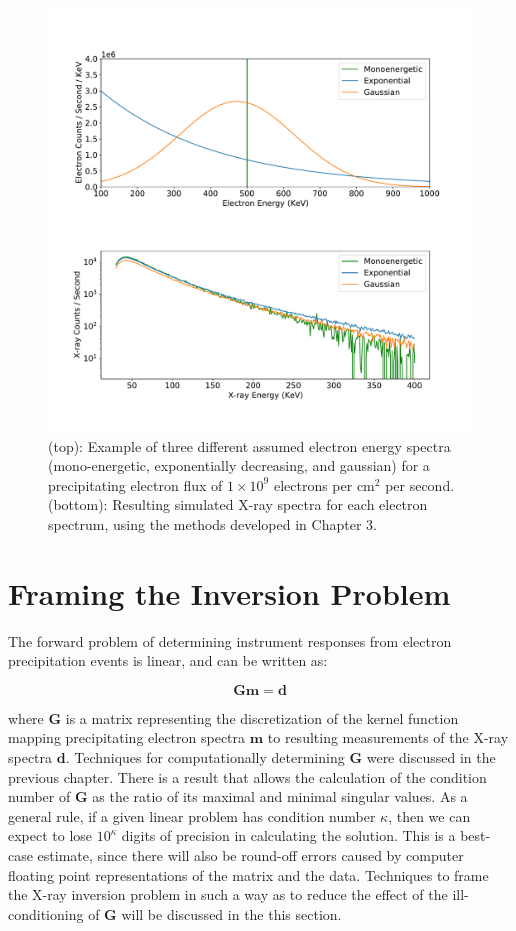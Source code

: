 \begin{figure}[p]
\label{why_ill_conditioned}
\centering
\includegraphics[width=1.0\textwidth]{figures/fig_0.pdf}
\caption{(top): Example of three different assumed electron energy spectra (mono-energetic, exponentially decreasing, and gaussian) for a precipitating electron flux of $1\times10^9$ electrons per $\mbox{cm}^2$ per second. (bottom): Resulting simulated X-ray spectra for each electron spectrum, using the methods developed in Chapter 3.} 
\end{figure}

\section{Framing the Inversion Problem}

The forward problem of determining instrument responses from electron precipitation events is linear, and can be written as:

$$\mathbf{G}\mathbf{m} = \mathbf{d}$$

where $\mathbf{G}$ is a matrix representing the discretization of the kernel function mapping precipitating electron spectra $\mathbf{m}$ to resulting measurements of the X-ray spectra $\mathbf{d}$. Techniques for computationally determining $\mathbf{G}$ were discussed in the previous chapter. There is a result that allows the calculation of the condition number of $\mathbf{G}$ as the ratio of its maximal and minimal singular values. As a general rule, if a given linear problem has condition number $\kappa$, then we can expect to lose $10^\kappa$ digits of precision in calculating the solution. This is a best-case estimate, since there will also be round-off errors caused by computer floating point representations of the matrix and the data. Techniques to frame the X-ray inversion problem in such a way as to reduce the effect of the ill-conditioning  of $\mathbf{G}$ will be discussed in the this section.

